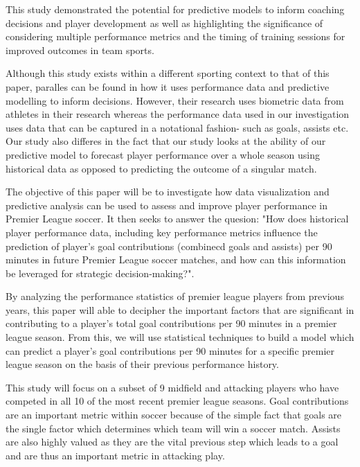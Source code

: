 \documentclass[12pt]{article}
\begin{document}
This study demonstrated the potential for predictive models to inform coaching
decisions and player development as well as highlighting the significance of
considering multiple performance metrics and the timing of training sessions for
improved outcomes in team sports.

Although this study exists within a different sporting context to that of this 
paper, paralles can be found in how it uses performance data and predictive
modelling to inform decisions. However, their research uses biometric data from 
athletes in their research whereas the performance data used in our investigation
uses data that can be captured in a notational fashion- such as goals, assists 
etc. Our study also differes in the fact that our study looks at the ability
of our predictive model to forecast player performance over a whole season using
historical data as opposed to predicting the outcome of a singular match.



The objective of this paper will be to investigate how data visualization and
predictive analysis can be used to assess and improve player performance in
Premier League soccer. It then seeks to answer the quesion:
"How does historical player performance data, including key performance
metrics influence the prediction of player's goal contributions
(combinecd goals and assists) per 90 minutes in future Premier League 
soccer matches, and how can this information be leveraged for strategic 
decision-making?".

By analyzing the performance statistics of premier league 
players from previous years, this paper will able to decipher the important
factors that are significant in contributing to a player's total goal
contributions per 90 minutes in a premier league season. From this, we will use 
statistical techniques to build a model which can predict a player's goal 
contributions per 90 minutes for a specific premier league season on the basis
of their previous performance history. 

This study will focus on a subset of 9 
midfield and attacking players who have competed in all 10 of the most recent 
premier league seasons. Goal contributions are an important metric within soccer
because of the simple fact that goals are the single factor which determines
which team will win a soccer match. Assists are also highly valued as they are
the vital previous step which leads to a goal and are thus an important metric
in attacking play.
\end{document}
